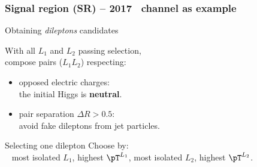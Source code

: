 %

\begin{frame}
\frametitle{Signal region (SR) -- 2017 \mu\tauh\ channel as example}

\begin{block}{Obtaining \emph{dileptons} candidates}
\begin{minipage}[c]{.55\linewidth}
With all $L_1$ and $L_2$ passing selection,\\
compose  pairs ($L_1L_2$) respecting:
\begin{itemize}
\item opposed electric charges:\\ the initial Higgs is \textbf{neutral}.
\item pair separation $\Delta R > \num{0.5}$:\\ avoid fake dileptons from jet particles.
\end{itemize}
\end{minipage}
\begin{minipage}[c]{.4\linewidth}
\vspace{\baselineskip}

\vspace{\baselineskip}
\end{minipage}
\end{block}
\pause
\begin{block}{Selecting one dilepton}
Choose by:\\
~\hfill
most isolated $L_1$,
\hfill
highest $\pT^{L_1}$,
\hfill
most isolated $L_2$,
\hfill
highest $\pT^{L_2}$.
\hfill~
\end{block}

\end{frame}


